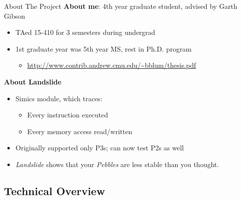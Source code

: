 \documentclass[xcolor=dvipsnames]{beamer}
\begin{document}
\begin{frame}{About The Project}
	\textbf{About me}: 4th year graduate student, advised by Garth Gibson
	\begin{itemize}
		\item TAed 15-410 for 3 semesters during undergrad
		\item 1st graduate year was 5th year MS, rest in Ph.D. program
		\begin{itemize}
			\item \url{http://www.contrib.andrew.cmu.edu/~bblum/thesis.pdf}
		\end{itemize}
	\end{itemize}
	\pause
	\linegap

	{\bf About Landslide}
	\begin{itemize}
		\item Simics module, which traces:
			\begin{itemize}
				\item Every instruction executed
				\item Every memory access read/written
			\end{itemize}
		\item Originally supported only P3s; can now test P2s as well
		\item {\em Landslide} shows that your {\em Pebbles} are less stable than you thought.
	\end{itemize}
\end{frame}


\subsection{Technical Overview}
\end{document}
